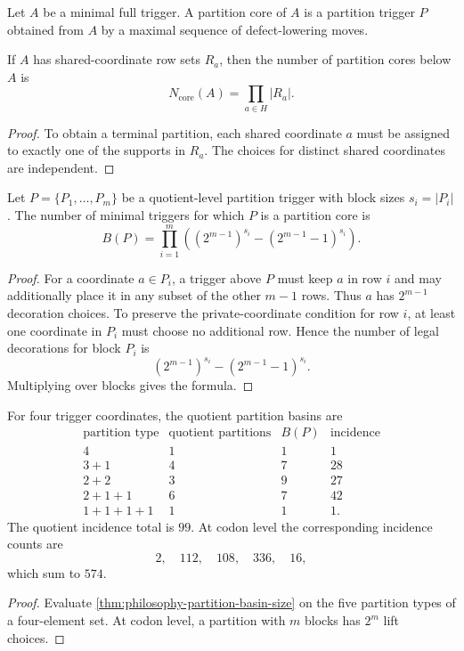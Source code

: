 \begin{definition}
\label{def:philosophy-partition-core}
Let $A$ be a minimal full trigger. A partition core of $A$ is a
partition trigger $P$ obtained from $A$ by a maximal sequence of
defect-lowering moves.
\end{definition}

\begin{theorem}
\label{thm:philosophy-trigger-core-count}
If $A$ has shared-coordinate row sets $R_{a}$, then the number of
partition cores below $A$ is
$$
  N_{\mathrm{core}}(A)
  =
  \prod_{a\in H}|R_{a}|.
$$
\end{theorem}
\begin{proof}
To obtain a terminal partition, each shared coordinate $a$ must be
assigned to exactly one of the supports in $R_{a}$. The choices for
distinct shared coordinates are independent.
\end{proof}

\begin{theorem}
\label{thm:philosophy-partition-basin-size}
Let $P=\{P_{1},\ldots,P_{m}\}$ be a quotient-level partition trigger
with block sizes $s_{i}=|P_{i}|$. The number of minimal triggers for
which $P$ is a partition core is
$$
  B(P)
  =
  \prod_{i=1}^{m}
  \left(
    (2^{m-1})^{s_{i}}
    -
    (2^{m-1}-1)^{s_{i}}
  \right).
$$
\end{theorem}
\begin{proof}
For a coordinate $a\in P_{i}$, a trigger above $P$ must keep $a$ in row
$i$ and may additionally place it in any subset of the other $m-1$
rows. Thus $a$ has $2^{m-1}$ decoration choices. To preserve the
private-coordinate condition for row $i$, at least one coordinate in
$P_{i}$ must choose no additional row. Hence the number of legal
decorations for block $P_{i}$ is
$$
  (2^{m-1})^{s_{i}}-(2^{m-1}-1)^{s_{i}}.
$$
Multiplying over blocks gives the formula.
\end{proof}

\begin{corollary}
\label{cor:philosophy-partition-basin-table}
For four trigger coordinates, the quotient partition basins are
$$
\begin{array}{c|r|r|r}
  \text{partition type} & \text{quotient partitions} & B(P) & \text{incidence}\\
  \hline
  4 & 1 & 1 & 1\\
  3+1 & 4 & 7 & 28\\
  2+2 & 3 & 9 & 27\\
  2+1+1 & 6 & 7 & 42\\
  1+1+1+1 & 1 & 1 & 1.
\end{array}
$$
The quotient incidence total is $99$. At codon level the corresponding
incidence counts are
$$
  2,\quad112,\quad108,\quad336,\quad16,
$$
which sum to $574$.
\end{corollary}
\begin{proof}
Evaluate \autoref{thm:philosophy-partition-basin-size} on the five
partition types of a four-element set. At codon level, a partition with
$m$ blocks has $2^{m}$ lift choices.
\end{proof}

